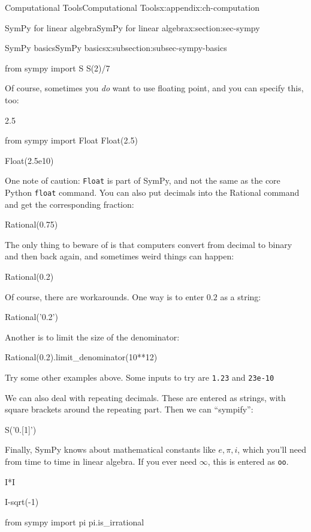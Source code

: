\documentclass[oneside,10pt,]{book}
\newcommand{\mono}[1]{\texttt{#1}}
\numberwithin{equation}{section}
\begin{document}
\begin{appendixptx}{Computational Tools}{}{Computational Tools}{}{}{x:appendix:ch-computation}
\begin{sectionptx}{SymPy for linear algebra}{}{SymPy for linear algebra}{}{}{x:section:sec-sympy}
\begin{subsectionptx}{SymPy basics}{}{SymPy basics}{}{}{x:subsection:subsec-sympy-basics}
\begin{sageinput}
from sympy import S
S(2)/7
\end{sageinput}
Of course, sometimes you \emph{do} want to use floating point, and you can specify this, too:%
\begin{sageinput}
2.5
\end{sageinput}
\begin{sageinput}
from sympy import Float
Float(2.5)
\end{sageinput}
\begin{sageinput}
Float(2.5e10)
\end{sageinput}
One note of caution: \mono{Float} is part of SymPy, and not the same as the core Python \mono{float} command. You can also put decimals into the Rational command and get the corresponding fraction:%
\begin{sageinput}
Rational(0.75)
\end{sageinput}
The only thing to beware of is that computers convert from decimal to binary and then back again, and sometimes weird things can happen:%
\begin{sageinput}
Rational(0.2)
\end{sageinput}
Of course, there are workarounds. One way is to enter \(0.2\) as a string:%
\begin{sageinput}
Rational('0.2')
\end{sageinput}
Another is to limit the size of the denominator:%
\begin{sageinput}
Rational(0.2).limit_denominator(10**12)
\end{sageinput}
Try some other examples above. Some inputs to try are \mono{1.23} and \mono{23e-10}%
\par
We can also deal with repeating decimals. These are entered as strings, with square brackets around the repeating part. Then we can ``sympify'':%
\begin{sageinput}
S('0.[1]')
\end{sageinput}
Finally, SymPy knows about mathematical constants like \(e, \pi, i\), which you'll need from time to time in linear algebra. If you ever need \(\infty\), this is entered as \mono{oo}.%
\begin{sageinput}
I*I
\end{sageinput}
\begin{sageinput}
I-sqrt(-1)
\end{sageinput}
\begin{sageinput}
from sympy import pi
pi.is_irrational
\end{sageinput}

\end{subsectionptx}
\end{sectionptx}
\end{appendixptx}
\end{document}
